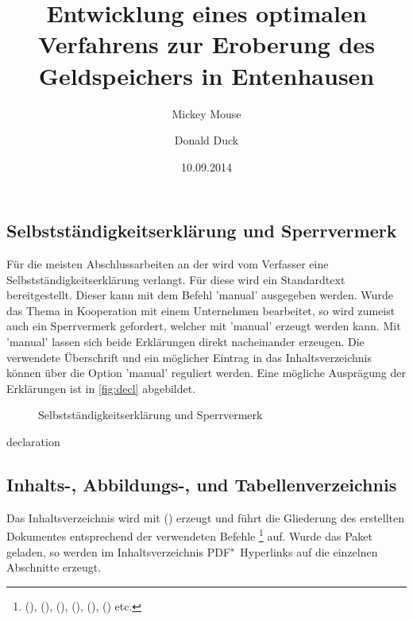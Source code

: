 \documentclass[%
  english,ngerman,%
  cdgeometry=no,DIV=12,%
  automark,%
  listof=toc,%
]{tudscrartcl}
\begin{document}
\subsection{Selbstständigkeitserklärung und Sperrvermerk}
Für die meisten Abschlussarbeiten an der \TnUD wird vom Verfasser eine 
Selbstständigkeitserklärung verlangt. Für diese wird ein Standardtext 
bereitgestellt. Dieser kann mit dem Befehl 'manual' 
ausgegeben werden. Wurde das Thema in Kooperation mit einem Unternehmen 
bearbeitet, so wird zumeist auch ein Sperrvermerk gefordert, welcher mit 
'manual' erzeugt werden kann. Mit 'manual' 
lassen sich beide Erklärungen direkt nacheinander erzeugen. Die verwendete 
Überschrift und ein möglicher Eintrag in das Inhaltsverzeichnis können über die 
Option 'manual' reguliert werden. Eine mögliche Ausprägung 
der Erklärungen ist in \autoref{fig:decl} abgebildet.
%
\begin{figure}
\centering
{}
\caption{Selbstständigkeitserklärung und Sperrvermerk}
\label{fig:decl}
\end{figure}

\begin{Hint!}{declaration}
\title{%
  Entwicklung eines optimalen Verfahrens zur Eroberung des
  Geldspeichers in Entenhausen
}
\author{Mickey Mouse\and Donald Duck}
\date{10.09.2014}
\declaration[company=FIRMA]
\end{Hint!}
\begin{Trunk+}
\declaration[company=FIRMA]

\end{Trunk+}


\subsection{Inhalts-, Abbildungs-, und Tabellenverzeichnis}
Das Inhaltsverzeichnis wird mit () 
erzeugt und führt die Gliederung des erstellten Dokumentes entsprechend der 
verwendeten Befehle%
\footnote{%
  (),
  (), 
  (), 
  (), 
  (),
  () etc.%
}
auf. Wurde das Paket  geladen, so werden im 
Inhaltsverzeichnis PDF"~Hyperlinks auf die einzelnen Abschnitte erzeugt.
\end{document}
